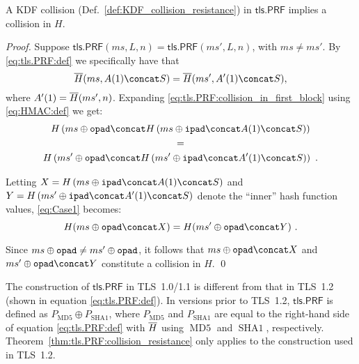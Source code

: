 \begin{theorem}\label{thm:tls.PRF:collision_resistance}
A KDF collision (Def.~\ref{def:KDF_collision_resistance}) in $\mathsf{tls.PRF}$  implies a collision in $H$.
\end{theorem}
\begin{proof}

Suppose $\mathsf{tls.PRF}(ms, L, n) = \mathsf{tls.PRF}(ms', L, n)$, with $ms \neq ms'$.
By \eqref{eq:tls.PRF:def} we specifically have that 
\begin{equation}\label{eq:tls.PRF:collision_in_first_block}
	\M(ms, A(1) \concat S) = \M(ms', A'(1) \concat S),
\end{equation}
where $A'(1) = \overline{H}(ms',n)$.
Expanding \eqref{eq:tls.PRF:collision_in_first_block} using \eqref{eq:HMAC:def} we get: 
\begin{equation}
	\begin{gathered}\label{eq:Case1}
		H \left(ms \oplus \padO \concat H \left(ms \oplus \padI \concat A(1) \concat S \right) \right) \\
		= \\
		H \left(ms' \oplus \padO \concat H \left(ms' \oplus \padI \concat A'(1) \concat S \right) \right) \ .
	\end{gathered}
\end{equation}

Letting $X = H \left(ms \oplus \padI \concat A(1) \concat S \right)$ and $Y = H \left(ms' \oplus \padI \concat A'(1) \concat S \right)$ denote the ``inner'' hash function values,
\eqref{eq:Case1} becomes:
\begin{equation}\label{eq:}
	H (ms \oplus \padO \concat X )
	=
	H (ms' \oplus \padO \concat Y ) \ .
\end{equation}

Since $ms \oplus \mathtt{opad}  \neq ms' \oplus \mathtt{opad}$,
it follows that  $ms \oplus \padO \concat X$ and $ms' \oplus \padO \concat Y$ constitute a collision in $H$. \qed
\end{proof}

\begin{remark}
The construction of $\mathsf{tls.PRF}$ in TLS~1.0/1.1 is different from that in TLS~1.2
(shown in equation \eqref{eq:tls.PRF:def}).
In versions prior to TLS~1.2,
$\mathsf{tls.PRF}$ is defined as $P_{\mathrm{MD5}} \oplus P_{\mathrm{SHA1}}$,
where $P_{\mathrm{MD5}}$ and $P_{\mathrm{SHA1}}$ are equal to the right-hand side of equation \eqref{eq:tls.PRF:def} with $\overline{H}$ using $\operatorname{\mathrm{MD5}}$ and $\operatorname{\mathrm{SHA1}}$,
respectively. 
Theorem~\ref{thm:tls.PRF:collision_resistance} only applies to the construction used in TLS~1.2.
\end{remark}